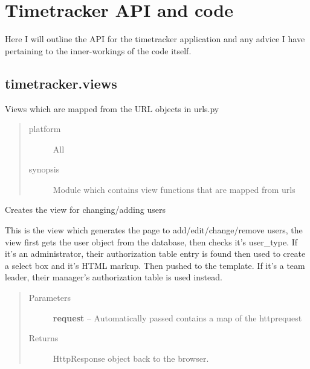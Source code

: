\documentclass[letterpaper,10pt,english]{sphinxmanual}
\begin{document}
\section{Timetracker API and code}
\label{timetracker:timetracker-api-and-code}\label{timetracker::doc}
Here I will outline the API for the timetracker application and any advice I
have pertaining to the inner-workings of the code itself.


\subsection{timetracker.views}
\label{timetracker:module-timetracker.views}\label{timetracker:timetracker-views}
Views which are mapped from the URL objects in urls.py
\begin{quote}\begin{description}
\item[{platform}] \leavevmode
All

\item[{synopsis}] \leavevmode
Module which contains view functions that are mapped from urls

\end{description}\end{quote}

\begin{fulllineitems}
\label{timetracker:timetracker.views.add_change_user}
Creates the view for changing/adding users

This is the view which generates the page to add/edit/change/remove users,
the view first gets the user object from the database, then checks it's
user\_type. If it's an administrator, their authorization table entry is
found then used to create a select box and it's HTML markup. Then pushed
to the template. If it's a team leader, their manager's authorization
table is used instead.
\begin{quote}\begin{description}
\item[{Parameters}] \leavevmode
\textbf{request} -- Automatically passed contains a map of the httprequest

\item[{Returns}] \leavevmode
HttpResponse object back to the browser.

\end{description}\end{quote}

\end{fulllineitems}
\end{document}
